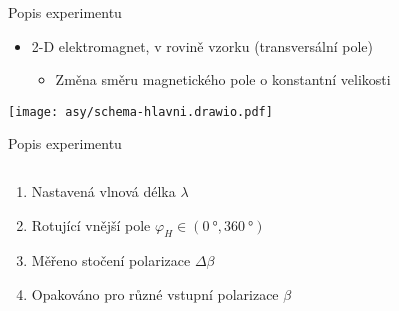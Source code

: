 \documentclass{beamer}
\begin{document}
\begin{frame}{Popis experimentu}
    \begin{itemize}
        \item 2-D elektromagnet, v rovině vzorku (transversální pole)
            \begin{itemize}
                \item Změna směru magnetického pole o konstantní velikosti
            \end{itemize}
    \end{itemize}
    \vspace{0.3cm}
    \hspace{1cm}
    \texttt{[image: asy/schema-hlavni.drawio.pdf]}
\end{frame}

\begin{frame}{Popis experimentu}
    \begin{columns}
        \begin{column}{0.55\textwidth}
            
    \begin{enumerate}
        \item Nastavená vlnová délka $\lambda$
        \item<2-> Rotující vnější pole $\varphi_{H} \in (\SI{0}{\degree},\SI{360}{\degree})$
        \item<3-> Měřeno stočení polarizace $\Delta\beta$
        \item<4-> Opakováno pro různé vstupní polarizace $\beta$
    \end{enumerate}
        \end{column}
        \begin{column}{0.45\textwidth}
        \end{column}
\end{columns}
\end{frame}
\end{document}
